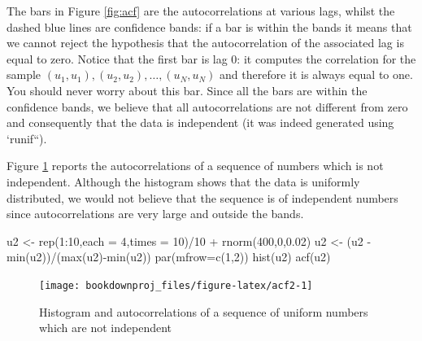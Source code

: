 \documentclass[
]{book}
\newenvironment{Shaded}{\begin{snugshade}}{\end{snugshade}}
\newcommand{\AttributeTok}[1]{\textcolor[rgb]{0.77,0.63,0.00}{#1}}
\newcommand{\DecValTok}[1]{\textcolor[rgb]{0.00,0.00,0.81}{#1}}
\newcommand{\FloatTok}[1]{\textcolor[rgb]{0.00,0.00,0.81}{#1}}
\newcommand{\FunctionTok}[1]{\textcolor[rgb]{0.00,0.00,0.00}{#1}}
\newcommand{\NormalTok}[1]{#1}
\newcommand{\OtherTok}[1]{\textcolor[rgb]{0.56,0.35,0.01}{#1}}
\newcommand{\SpecialCharTok}[1]{\textcolor[rgb]{0.00,0.00,0.00}{#1}}
\theoremstyle{definition}
\theoremstyle{definition}
\theoremstyle{definition}
\theoremstyle{definition}
\theoremstyle{remark}
\begin{document}
The bars in Figure \ref{fig:acf} are the autocorrelations at various lags, whilst the dashed blue lines are confidence bands: if a bar is within the bands it means that we cannot reject the hypothesis that the autocorrelation of the associated lag is equal to zero. Notice that the first bar is lag 0: it computes the correlation for the sample \((u_1,u_1),(u_2,u_2),\dots,(u_N,u_N)\) and therefore it is always equal to one. You should never worry about this bar. Since all the bars are within the confidence bands, we believe that all autocorrelations are not different from zero and consequently that the data is independent (it was indeed generated using `runif``).

Figure \ref{fig:acf2} reports the autocorrelations of a sequence of numbers which is not independent. Although the histogram shows that the data is uniformly distributed, we would not believe that the sequence is of independent numbers since autocorrelations are very large and outside the bands.

\begin{Shaded}
\begin{Highlighting}[]
\NormalTok{u2 }\OtherTok{\textless{}{-}} \FunctionTok{rep}\NormalTok{(}\DecValTok{1}\SpecialCharTok{:}\DecValTok{10}\NormalTok{,}\AttributeTok{each =} \DecValTok{4}\NormalTok{,}\AttributeTok{times =} \DecValTok{10}\NormalTok{)}\SpecialCharTok{/}\DecValTok{10} \SpecialCharTok{+} \FunctionTok{rnorm}\NormalTok{(}\DecValTok{400}\NormalTok{,}\DecValTok{0}\NormalTok{,}\FloatTok{0.02}\NormalTok{) }
\NormalTok{u2 }\OtherTok{\textless{}{-}}\NormalTok{ (u2 }\SpecialCharTok{{-}} \FunctionTok{min}\NormalTok{(u2))}\SpecialCharTok{/}\NormalTok{(}\FunctionTok{max}\NormalTok{(u2)}\SpecialCharTok{{-}}\FunctionTok{min}\NormalTok{(u2))}
\FunctionTok{par}\NormalTok{(}\AttributeTok{mfrow=}\FunctionTok{c}\NormalTok{(}\DecValTok{1}\NormalTok{,}\DecValTok{2}\NormalTok{))}
\FunctionTok{hist}\NormalTok{(u2)}
\FunctionTok{acf}\NormalTok{(u2)}
\end{Highlighting}
\end{Shaded}

\begin{figure}

{\centering \texttt{[image: bookdownproj\_files/figure-latex/acf2-1]} 

}

\caption{Histogram and autocorrelations of a sequence of uniform numbers which are not independent}\label{fig:acf2}
\end{figure}
\end{document}
